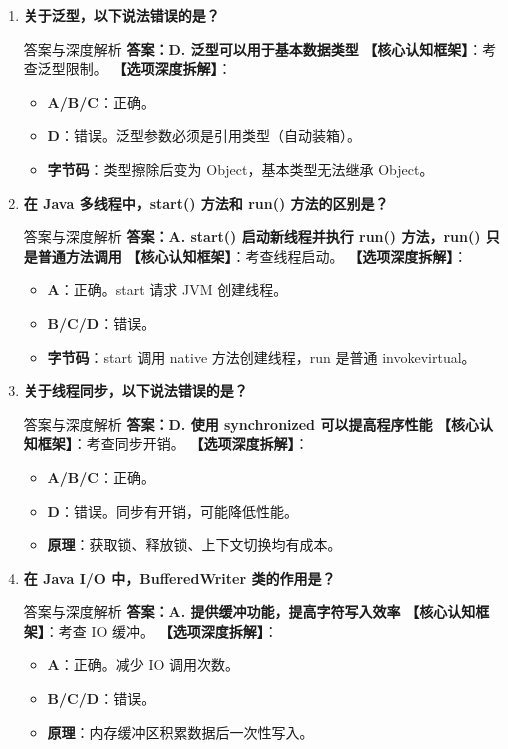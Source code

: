 \documentclass[12pt, a4paper]{ctexart}
\begin{document}
\begin{enumerate}[label=\arabic*.]
\item \textbf{关于泛型，以下说法错误的是？}
\begin{bluebox}{答案与深度解析}
\textbf{答案：D. 泛型可以用于基本数据类型}
\textbf{【核心认知框架】}：考查泛型限制。
\textbf{【选项深度拆解】}：
\begin{itemize}[leftmargin=*, nosep]
    \item \textbf{A/B/C}：正确。
    \item \textbf{D}：错误。泛型参数必须是引用类型（自动装箱）。
    \item \textbf{字节码}：类型擦除后变为 Object，基本类型无法继承 Object。
\end{itemize}
\end{bluebox}

\item \textbf{在 Java 多线程中，start() 方法和 run() 方法的区别是？}
\begin{bluebox}{答案与深度解析}
\textbf{答案：A. start() 启动新线程并执行 run() 方法，run() 只是普通方法调用}
\textbf{【核心认知框架】}：考查线程启动。
\textbf{【选项深度拆解】}：
\begin{itemize}[leftmargin=*, nosep]
    \item \textbf{A}：正确。start 请求 JVM 创建线程。
    \item \textbf{B/C/D}：错误。
    \item \textbf{字节码}：start 调用 native 方法创建线程，run 是普通 invokevirtual。
\end{itemize}
\end{bluebox}

\item \textbf{关于线程同步，以下说法错误的是？}
\begin{bluebox}{答案与深度解析}
\textbf{答案：D. 使用 synchronized 可以提高程序性能}
\textbf{【核心认知框架】}：考查同步开销。
\textbf{【选项深度拆解】}：
\begin{itemize}[leftmargin=*, nosep]
    \item \textbf{A/B/C}：正确。
    \item \textbf{D}：错误。同步有开销，可能降低性能。
    \item \textbf{原理}：获取锁、释放锁、上下文切换均有成本。
\end{itemize}
\end{bluebox}

\item \textbf{在 Java I/O 中，BufferedWriter 类的作用是？}
\begin{bluebox}{答案与深度解析}
\textbf{答案：A. 提供缓冲功能，提高字符写入效率}
\textbf{【核心认知框架】}：考查 IO 缓冲。
\textbf{【选项深度拆解】}：
\begin{itemize}[leftmargin=*, nosep]
    \item \textbf{A}：正确。减少 IO 调用次数。
    \item \textbf{B/C/D}：错误。
    \item \textbf{原理}：内存缓冲区积累数据后一次性写入。
\end{itemize}
\end{bluebox}


\end{enumerate}
\end{document}
